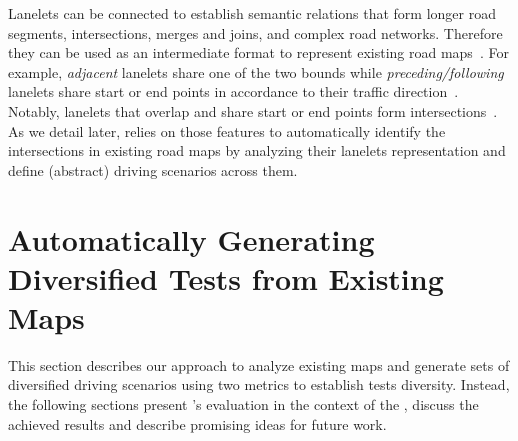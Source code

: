 \documentclass[conference]{IEEEtran}
\begin{document}
Lanelets can be connected to establish semantic relations that form longer road segments, intersections, merges and joins, and complex road networks. Therefore
they can be used as an intermediate format to represent existing road maps~\cite{althoff2018automatic}. For example, \emph{adjacent} lanelets share one of the two bounds while \emph{preceding/following} lanelets share start or end points in accordance to their traffic direction~\cite{althoff2018automatic}. Notably, lanelets that overlap and share start or end points form intersections~\cite{Althoff2017a}.
%
As we detail later, \tool relies on those features to automatically identify the intersections in existing road maps by analyzing their lanelets representation and define (abstract) driving scenarios across them.


\section{Automatically Generating Diversified Tests from Existing Maps}
This section describes our approach to analyze existing maps and generate sets of diversified driving scenarios using two metrics to establish tests diversity. Instead, the following sections present \tool's evaluation in the context of the \challenge, discuss the achieved results and describe promising ideas for future work.
\end{document}
